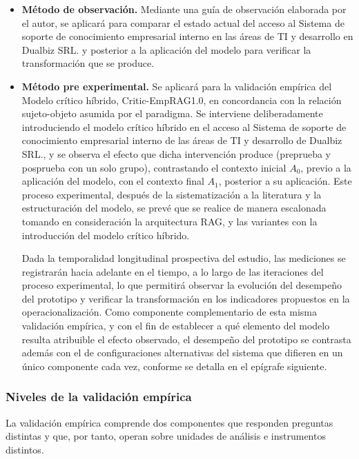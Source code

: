 \begin{itemize}
    \item \textbf{Método de observación.} Mediante una guía de observación elaborada por el autor, se aplicará para comparar el estado actual del acceso al Sistema de soporte de conocimiento empresarial interno en las áreas de TI y desarrollo en Dualbiz SRL. y posterior a la aplicación del modelo para verificar la transformación que se produce.
    
    \item \textbf{Método pre experimental.} Se aplicará para la validación empírica del Modelo crítico híbrido, Critic-EmpRAG1.0, en concordancia con la relación sujeto-objeto asumida por el paradigma. Se interviene deliberadamente introduciendo el modelo crítico híbrido en el acceso al Sistema de soporte de conocimiento empresarial interno de las áreas de TI y desarrollo de Dualbiz SRL., y se observa el efecto que dicha intervención produce (preprueba y posprueba con un solo grupo), contrastando el contexto inicial $A_0$, previo a la aplicación del modelo, con el contexto final $A_1$, posterior a su aplicación. Este proceso experimental, después de la sistematización a la literatura y la estructuración del modelo, se prevé que se realice de manera escalonada tomando en consideración la arquitectura RAG, y las variantes con la introducción del modelo crítico híbrido.
    
    Dada la temporalidad longitudinal prospectiva del estudio, las mediciones se registrarán hacia adelante en el tiempo, a lo largo de las iteraciones del proceso experimental, lo que permitirá observar la evolución del desempeño del prototipo y verificar la transformación en los indicadores propuestos en la operacionalización. Como componente complementario de esta misma validación empírica, y con el fin de establecer a qué elemento del modelo resulta atribuible el efecto observado, el desempeño del prototipo se contrasta además con el de configuraciones alternativas del sistema que difieren en un único componente cada vez, conforme se detalla en el epígrafe siguiente.

\end{itemize}

\subsubsection*{Niveles de la validación empírica}

La validación empírica comprende dos componentes que responden preguntas distintas y que, por tanto, operan sobre unidades de análisis e instrumentos distintos.

